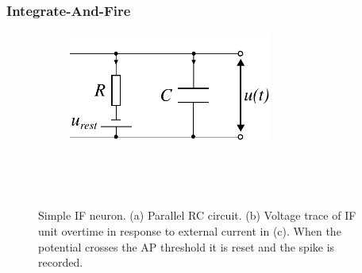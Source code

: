 \subsubsection{Integrate-And-Fire}
\begin{figure}[ht]
	\centering
	\hspace{-10mm}
	\begin{subfigure}[t]{0.45\textwidth}
		\centering
		\vspace{14mm}
		\hspace{-4mm}
		\caption{}
		\label{fig:rc}
		\vspace{3mm}
		\hspace{4mm}
		\includegraphics[height=1.4in]{figs/parallel_rc}
	\end{subfigure}
	~
	\begin{subfigure}[t]{0.45\textwidth}
		\centering
		\begin{subfigure}[t]{0.8\textwidth}
			\caption{}
			\label{fig:ifu}
			\hspace{-10mm}
			
		\end{subfigure}
		~
		\begin{subfigure}[t]{0.8\textwidth}
			\caption{}
			\hspace{-10mm}
			
			\label{fig:ifi}
		\end{subfigure}
	\end{subfigure}
	\caption{Simple IF neuron. (a) Parallel RC circuit. (b) Voltage trace of IF unit overtime in response to external current in (c). When the potential crosses
		the AP threshold it is reset and the spike is recorded.}
	\label{fig:if}
\end{figure}

